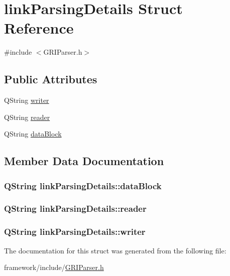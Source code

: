 \hypertarget{structlinkParsingDetails}{\section{link\-Parsing\-Details \-Struct \-Reference}
\label{structlinkParsingDetails}
}


{\ttfamily \#include $<$\-G\-R\-I\-Parser.\-h$>$}

\subsection*{\-Public \-Attributes}
\begin{DoxyCompactItemize}
\item 
\-Q\-String \hyperlink{structlinkParsingDetails_acf1eb39396303815bd795faa067abfd3}{writer}
\item 
\-Q\-String \hyperlink{structlinkParsingDetails_a9d646b46b76d26d576ebaf89486e683a}{reader}
\item 
\-Q\-String \hyperlink{structlinkParsingDetails_a035d32c6e584431a2979c5c0e72ea8f3}{data\-Block}
\end{DoxyCompactItemize}


\subsection{\-Member \-Data \-Documentation}
\hypertarget{structlinkParsingDetails_a035d32c6e584431a2979c5c0e72ea8f3}{
\subsubsection[{data\-Block}]{\setlength{\rightskip}{0pt plus 5cm}\-Q\-String {\bf link\-Parsing\-Details\-::data\-Block}}}\label{structlinkParsingDetails_a035d32c6e584431a2979c5c0e72ea8f3}
\hypertarget{structlinkParsingDetails_a9d646b46b76d26d576ebaf89486e683a}{
\subsubsection[{reader}]{\setlength{\rightskip}{0pt plus 5cm}\-Q\-String {\bf link\-Parsing\-Details\-::reader}}}\label{structlinkParsingDetails_a9d646b46b76d26d576ebaf89486e683a}
\hypertarget{structlinkParsingDetails_acf1eb39396303815bd795faa067abfd3}{
\subsubsection[{writer}]{\setlength{\rightskip}{0pt plus 5cm}\-Q\-String {\bf link\-Parsing\-Details\-::writer}}}\label{structlinkParsingDetails_acf1eb39396303815bd795faa067abfd3}


\-The documentation for this struct was generated from the following file\-:\begin{DoxyCompactItemize}
\item 
framework/include/\hyperlink{GRIParser_8h}{\-G\-R\-I\-Parser.\-h}\end{DoxyCompactItemize}

